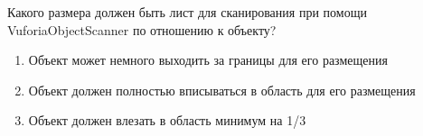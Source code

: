 
Какого размера должен быть лист для сканирования при помощи VuforiaObjectScanner по отношению к объекту?

\begin{enumerate}
    \item Объект может немного выходить за границы для его размещения
    \item Объект должен полностью вписываться в область для его размещения
    \item Объект должен влезать в область минимум на 1/3
\end{enumerate}

